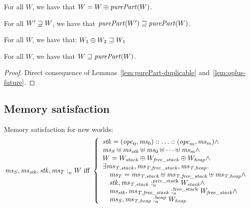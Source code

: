 \documentclass[a4paper]{article}
\begin{document}
\begin{lemma}
  \label{lem:purePart-duplicable}
 For all $W$, we have that $W = W \oplus \purePart{W}$.
\end{lemma}

\begin{lemma}
  \label{lem:purePart-mono}
 For all $W'\sqsupseteq W$, we have that $\purePart{W'} \future \purePart{W}$.
\end{lemma}

\begin{lemma}
  \label{lem:oplus-future}
  For all $W$, we have that:
  $W_1 \oplus W_2 \sqsupseteq W_1$
\end{lemma}

\begin{lemma}
  \label{lem:world-fut-purePart}
  For all $W$, we have that $W \future \purePart{W}$.
\end{lemma}
\begin{proof}
  Direct consequence of Lemmas~\ref{lem:purePart-duplicable}
  and~\ref{lem:oplus-future}.
\end{proof}

\subsection{Memory satisfaction}
Memory satisfaction for new worlds:
\[
  \mathit{ms}_S,\mathit{ms}_{\mathit{stk}},\mathit{stk},\mathit{ms}_T :_{n}^{}W \text{ iff } 
  \left\{
    \begin{array}{l}
      \mathit{stk} = (\mathit{opc}_0,\mathit{ms}_0):: \dots :: (\mathit{opc}_m,\mathit{ms}_m) \wedge \\
      \mathit{ms}_S \uplus \mathit{ms}_{\mathit{stk}} \uplus \mathit{ms}_0 \uplus \dots \uplus \mathit{ms}_m  \wedge\\
      W = W_{\mathit{stack}} \oplus W_{\mathit{free\_stack}} \oplus W_{\mathit{heap}} \wedge\\
      \exists \mathit{ms}_{\mathit{T,stack}}, \mathit{ms}_{\mathit{T,free\_stack}}, \mathit{ms}_{\mathit{T,heap}}\ldotp \\
      \quad \mathit{ms}_T = \mathit{ms}_{\mathit{T,stack}} \uplus \mathit{ms}_{\mathit{T,free\_stack}} \uplus \mathit{ms}_{\mathit{T,heap}} \wedge \\
      \quad \mathit{stk},\mathit{ms}_{\mathit{T,stack}} :_{n}^{\text{priv\_stack}}W_{\mathit{stack}} \wedge \\
      \quad \mathit{ms}_{\mathit{stk}},\mathit{ms}_{\mathit{T,free\_stack}} :_{n}^{\text{free\_stack}}W_{\mathit{free\_stack}} \wedge \\
      \quad \mathit{ms}_S,\mathit{ms}_{\mathit{T,heap}} :_{n}^{\text{heap}}W_{\mathit{heap}}
    \end{array}
  \right.
\]
\end{document}
